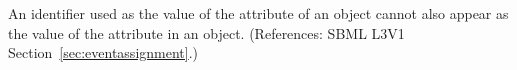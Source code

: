 An identifier used as the value of the attribute  of an
\EventAssignment object cannot also appear as the value of the
 attribute in an \AssignmentRule object.  (References: SBML
L3V1 Section~\ref{sec:eventassignment}.)
